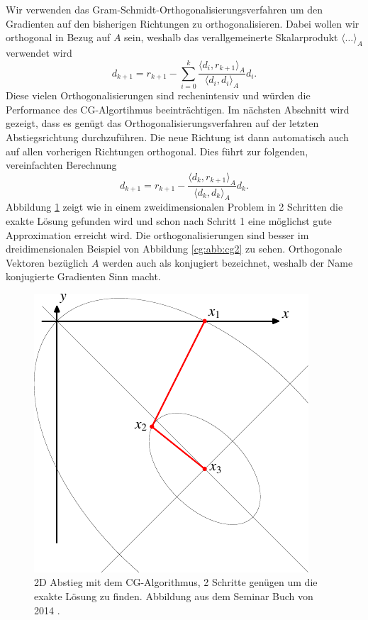Wir verwenden das Gram-Schmidt-Orthogonalisierungsverfahren um den Gradienten auf den bisherigen Richtungen zu orthogonalisieren.
Dabei wollen wir orthogonal in Bezug auf $A$ sein, weshalb das verallgemeinerte Skalarprodukt $\langle \dots \rangle_A$ verwendet wird 
\begin{equation}
	d_{k+1} 
	= 
	r_{k+1} - \sum_{i=0}^{k} \frac{\langle d_i , r_{k+1} \rangle_A}{\langle d_i , d_i \rangle_A} d_i.
\end{equation}
Diese vielen Orthogonalisierungen sind rechenintensiv und würden die Performance des CG-Algortihmus beeinträchtigen.
Im nächsten Abschnitt wird gezeigt, dass es genügt das Orthogonalisierungsverfahren auf der letzten Abstiegsrichtung durchzuführen.
Die neue Richtung ist dann automatisch auch auf allen vorherigen Richtungen orthogonal.
Dies führt zur folgenden, vereinfachten Berechnung
\begin{equation}
	d_{k+1}
	= 
	r_{k+1} - \frac{\langle d_k , r_{k+1} \rangle_A}{\langle d_k , d_k \rangle_A} d_k.
\end{equation}
Abbildung \ref{cg:abb:cg1} zeigt wie in einem zweidimensionalen Problem in 2 Schritten die exakte Lösung gefunden wird und schon nach Schritt 1 eine möglichst gute Approximation erreicht wird.
Die orthogonalisierungen sind besser im dreidimensionalen Beispiel von Abbildung \ref{cg:abb:cg2} zu sehen.
Orthogonale Vektoren bezüglich $A$ werden auch als konjugiert bezeichnet, weshalb der Name konjugierte Gradienten Sinn macht.
\begin{figure}	
	\centering
	\includegraphics{papers/cg/images/descent-3}
	\caption{2D Abstieg mit dem CG-Algorithmus, 2 Schritte genügen um die exakte Lösung zu finden. 
		Abbildung aus dem Seminar Buch von 2014 \cite{cg:book:hpc}.}
	\label{cg:abb:cg1}
\end{figure}

